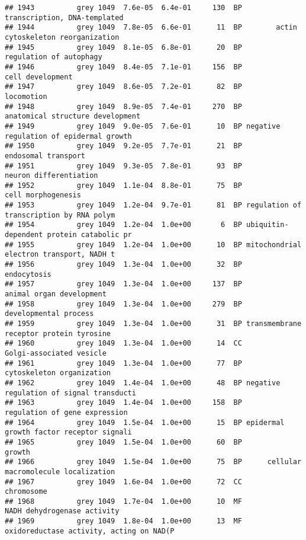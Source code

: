 \documentclass[]{article}
\begin{document}
\begin{verbatim}
## 1943          grey 1049  7.6e-05  6.4e-01     130  BP             transcription, DNA-templated
## 1944          grey 1049  7.8e-05  6.6e-01      11  BP        actin cytoskeleton reorganization
## 1945          grey 1049  8.1e-05  6.8e-01      20  BP                  regulation of autophagy
## 1946          grey 1049  8.4e-05  7.1e-01     156  BP                         cell development
## 1947          grey 1049  8.6e-05  7.2e-01      82  BP                               locomotion
## 1948          grey 1049  8.9e-05  7.4e-01     270  BP         anatomical structure development
## 1949          grey 1049  9.0e-05  7.6e-01      10  BP negative regulation of epidermal growth 
## 1950          grey 1049  9.2e-05  7.7e-01      21  BP                      endosomal transport
## 1951          grey 1049  9.3e-05  7.8e-01      93  BP                   neuron differentiation
## 1952          grey 1049  1.1e-04  8.8e-01      75  BP                       cell morphogenesis
## 1953          grey 1049  1.2e-04  9.7e-01      81  BP regulation of transcription by RNA polym
## 1954          grey 1049  1.2e-04  1.0e+00       6  BP ubiquitin-dependent protein catabolic pr
## 1955          grey 1049  1.2e-04  1.0e+00      10  BP mitochondrial electron transport, NADH t
## 1956          grey 1049  1.3e-04  1.0e+00      32  BP                              endocytosis
## 1957          grey 1049  1.3e-04  1.0e+00     137  BP                 animal organ development
## 1958          grey 1049  1.3e-04  1.0e+00     279  BP                    developmental process
## 1959          grey 1049  1.3e-04  1.0e+00      31  BP transmembrane receptor protein tyrosine 
## 1960          grey 1049  1.3e-04  1.0e+00      14  CC                 Golgi-associated vesicle
## 1961          grey 1049  1.3e-04  1.0e+00      77  BP                cytoskeleton organization
## 1962          grey 1049  1.4e-04  1.0e+00      48  BP negative regulation of signal transducti
## 1963          grey 1049  1.4e-04  1.0e+00     158  BP            regulation of gene expression
## 1964          grey 1049  1.5e-04  1.0e+00      15  BP epidermal growth factor receptor signali
## 1965          grey 1049  1.5e-04  1.0e+00      60  BP                                   growth
## 1966          grey 1049  1.5e-04  1.0e+00      75  BP      cellular macromolecule localization
## 1967          grey 1049  1.6e-04  1.0e+00      72  CC                               chromosome
## 1968          grey 1049  1.7e-04  1.0e+00      10  MF              NADH dehydrogenase activity
## 1969          grey 1049  1.8e-04  1.0e+00      13  MF oxidoreductase activity, acting on NAD(P

\end{verbatim}
\end{document}

